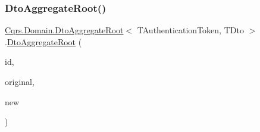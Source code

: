 \subsubsection{\texorpdfstring{Dto\+Aggregate\+Root()}{DtoAggregateRoot()}}
{\footnotesize\ttfamily \hyperlink{classCqrs_1_1Domain_1_1DtoAggregateRoot}{Cqrs.\+Domain.\+Dto\+Aggregate\+Root}$<$ T\+Authentication\+Token, T\+Dto $>$.\hyperlink{classCqrs_1_1Domain_1_1DtoAggregateRoot}{Dto\+Aggregate\+Root} (\begin{DoxyParamCaption}\item[{Guid}]{id,  }\item[{T\+Dto}]{original,  }\item[{T\+Dto @}]{new }\end{DoxyParamCaption})}

